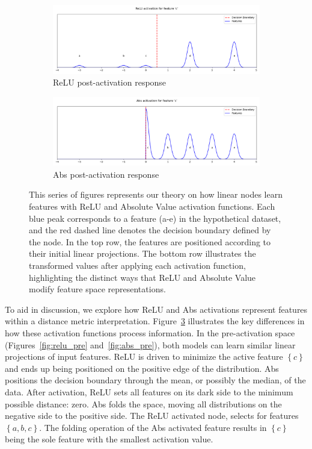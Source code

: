 \begin{figure}[t]
    \begin{subfigure}[b]{0.49\textwidth}
        \centering
        \includegraphics[width=\textwidth]{images/activation_demo_relu_post}
        \caption{ReLU post-activation response}
        \label{fig:relu_post}
    \end{subfigure}
    \hfill
    \begin{subfigure}[b]{0.49\textwidth}
        \centering
        \includegraphics[width=\textwidth]{images/activation_demo_abs_post}
        \caption{Abs post-activation response}
        \label{fig:abs_post}
    \end{subfigure}

    \caption{This series of figures represents our theory on how linear nodes learn features with ReLU and Absolute Value activation functions. Each blue peak corresponds to a feature (a-e) in the hypothetical dataset, and the red dashed line denotes the decision boundary defined by the node. In the top row, the features are positioned according to their initial linear projections. The bottom row illustrates the transformed values after applying each activation function, highlighting the distinct ways that ReLU and Absolute Value modify feature space representations.}
    \label{fig:activation_demo}
\end{figure}

To aid in discussion, we explore how ReLU and Abs activations represent features within a distance metric interpretation. Figure~\ref{fig:activation_demo} illustrates the key differences in how these activation functions process information. In the pre-activation space (Figures~\ref{fig:relu_pre} and~\ref{fig:abs_pre}), both models can learn similar linear projections of input features. ReLU is driven to minimize the active feature $\left\{ c \right\}$ and ends up being positioned on the positive edge of the distribution. Abs positions the decision boundary through the mean, or possibly the median, of the data. After activation, ReLU sets all features on its dark side to the minimum possible distance: zero. Abs folds the space, moving all distributions on the negative side to the positive side. The ReLU activated node, selects for features $\left\{ a, b, c \right\}$. The folding operation of the Abs activated feature results in $\left\{ c \right\}$ being the sole feature with the smallest activation value.

